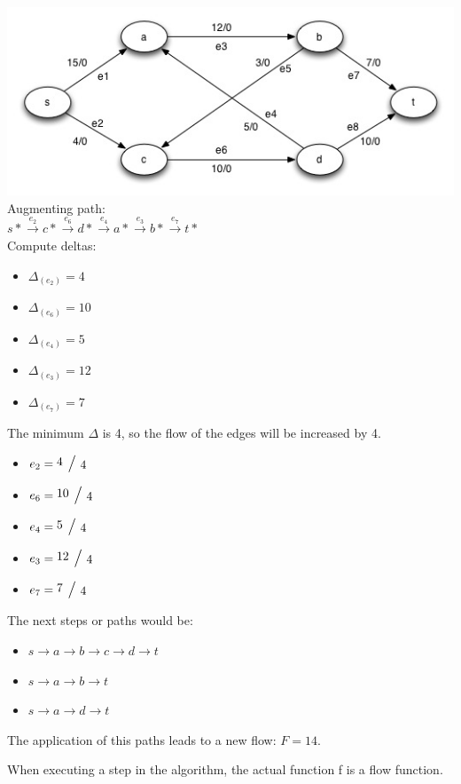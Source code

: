 \begin{example}
\includegraphics{diagrams/Chapter3_Example3.jpg} \\
Augmenting path: \\
$s* \xrightarrow{e_2} c* \xrightarrow{e_6} d* \xrightarrow{e_4} a* \xrightarrow{e_3} b* \xrightarrow{e_7} t*$ \\
Compute deltas:
\begin{itemize}
\item $\Delta_{(e_2)} = 4$
\item $\Delta_{(e_6)} = 10$
\item $\Delta_{(e_4)} = 5$
\item $\Delta_{(e_3)} = 12$
\item $\Delta_{(e_7)} = 7$
\end{itemize}
The minimum $\Delta$ is 4, so the flow of the edges will be increased by 4.
\begin{itemize}
\item $e_2 = \xfrac{4}{4}$
\item $e_6 = \xfrac{10}{4}$
\item $e_4 = \xfrac{5}{4}$
\item $e_3 = \xfrac{12}{4}$
\item $e_7 = \xfrac{7}{4}$
\end{itemize} 

The next steps or paths would be:
\begin{itemize}
\item $s \rightarrow a \rightarrow b \rightarrow c \rightarrow d \rightarrow t$
\item $s \rightarrow a \rightarrow b \rightarrow t$
\item $s \rightarrow a \rightarrow d \rightarrow t$
\end{itemize}
The application of this paths leads to a new flow: $F = 14$.
\end{example}

\begin{lemma}
When executing a step in the algorithm, the actual function f is a flow function.
\end{lemma}

